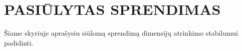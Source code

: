 \section{PASIŪLYTAS SPRENDIMAS}

Šiame skyriuje aprašysiu siūlomą sprendimą dimensijų atrinkimo stabilumui padidinti.